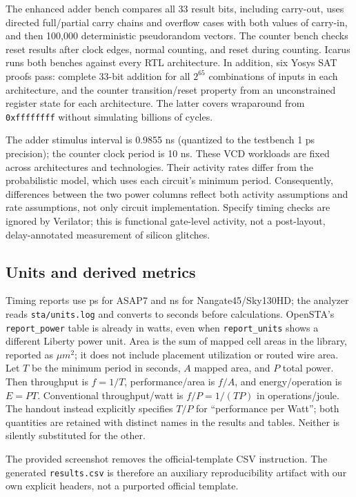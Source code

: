 \documentclass[10pt,letterpaper]{article}
\begin{document}
The enhanced adder bench compares all 33 result bits, including carry-out,
uses directed full/partial carry chains and overflow cases with both values
of carry-in, and then 100,000 deterministic pseudorandom vectors. The counter
bench checks reset results after clock edges, normal counting, and reset during counting.
Icarus runs both benches against every RTL architecture. In addition, six
Yosys SAT proofs pass: complete 33-bit addition for all $2^{65}$ combinations
of inputs in each architecture, and the counter transition/reset property
from an unconstrained register state for each architecture. The latter covers
wraparound from \texttt{0xffffffff} without simulating billions of cycles.

The adder stimulus interval is 0.9855 ns (quantized to the testbench 1 ps
precision); the counter clock period is 10 ns. These VCD workloads are fixed
across architectures and technologies. Their activity rates differ from the
probabilistic model, which uses each circuit's minimum period. Consequently,
differences between the two power columns reflect both activity assumptions
and rate assumptions, not only circuit implementation. Specify timing checks
are ignored by Verilator; this is functional gate-level activity, not a
post-layout, delay-annotated measurement of silicon glitches.

\subsection{Units and derived metrics}
Timing reports use ps for ASAP7 and ns for Nangate45/Sky130HD; the analyzer
reads \texttt{sta/units.log} and converts to seconds before calculations.
OpenSTA's \texttt{report\_power} table is already in watts, even when
\texttt{report\_units} shows a different Liberty power unit.
Area is the sum of mapped cell areas in the library, reported as $\mu m^2$;
it does not include placement utilization or routed wire area.
Let $T$ be the minimum period in seconds, $A$ mapped area, and $P$ total power.
Then throughput is $f=1/T$, performance/area is $f/A$, and energy/operation
is $E=PT$. Conventional throughput/watt is $f/P=1/(TP)$ in operations/joule.
The handout instead explicitly specifies $T/P$ for ``performance per Watt'';
both quantities are retained with distinct names in the results and tables.
Neither is silently substituted for the other.

The provided screenshot removes the official-template CSV instruction. The
generated \texttt{results.csv} is therefore an auxiliary reproducibility
artifact with our own explicit headers, not a purported official template.
\end{document}
